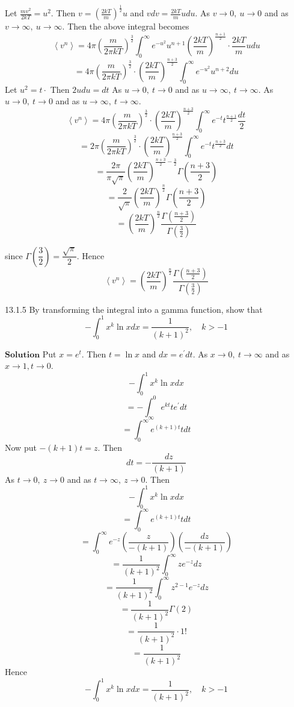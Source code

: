 \documentclass{article}
\begin{document}
\begin{flushleft}
Let $\frac{m v^{2}}{2 k T}=u^{2} .$ Then $v=\left(\frac{2 k T}{m}\right)^{\frac{1}{2}} u$ and $v d v=\frac{2 k T}{m} u d u$. As $v \rightarrow 0, \  u \rightarrow 0$ and as $v \rightarrow \infty, \  u \rightarrow \infty$. Then the above integral becomes
$$
\left\langle v^{n}\right\rangle=4 \pi\left(\frac{m}{2 \pi k T}\right)^{\frac{3}{2}} \int_{0}^{\infty} e^{-u^{2}} u^{n+1}\left(\frac{2 k T}{m}\right)^{\frac{n+1}{2}} \cdot \frac{2 k T}{m} u d u
$$
$$
=4 \pi\left(\frac{m}{2 \pi k T}\right)^{\frac{3}{2}} \cdot\left(\frac{2 k T}{m}\right)^{\frac{n+3}{2}} \int_{0}^{\infty} e^{-u^{2}} u^{n+2} d u
$$
Let $u^{2}=t \cdot$ Then $2 u d u=d t$ As $u \rightarrow 0, \  t \rightarrow 0$ and as $u \rightarrow \infty, \  t \rightarrow \infty$. As $u \rightarrow 0, \  t \rightarrow 0$ and as $u \rightarrow \infty, \  t \rightarrow \infty$.
$$
\left\langle v^{n}\right\rangle=4 \pi\left(\frac{m}{2 \pi k T}\right)^{\frac{3}{2}} \cdot\left(\frac{2 k T}{m}\right)^{\frac{n+3}{2}} \int_{0}^{\infty} e^{-t} t^{\frac{n+1}{2}} \frac{d t}{2}
$$
$$
=2 \pi\left(\frac{m}{2 \pi k T}\right)^{\frac{3}{2}} \cdot\left(\frac{2 k T}{m}\right)^{\frac{n+3}{2}} \int_{0}^{\infty} e^{-t} t^{\frac{n+3}{2}} d t
$$
$$
=\frac{2 \pi}{\pi \sqrt{\pi}}\left(\frac{2 k T}{m}\right)^{\frac{n+3}{2}-\frac{3}{2}} \Gamma\left(\frac{n+3}{2}\right)
$$
$$
=\frac{2}{\sqrt{\pi}}\left(\frac{2 k T}{m}\right)^{\frac{n}{2}} \Gamma\left(\frac{n+3}{2}\right)
$$
$$
=\left(\frac{2 k T}{m}\right)^{\frac{n}{2}} \frac{\Gamma\left(\frac{n+3}{2}\right)}{\Gamma\left(\frac{3}{2}\right)}
$$


since $\Gamma\left(\dfrac{3}{2}\right)=\dfrac{\sqrt{\pi}}{2}$. Hence 
$$\left\langle v^{n}\right\rangle=\left(\dfrac{2 k T}{m}\right)^{\frac{n}{2}} \frac{\Gamma\left(\frac{n+3}{2}\right)}{\Gamma\left(\frac{3}{2}\right)}$$

\newpage


\begin{mybox}{13.1.5}
By transforming the integral into a gamma function, show that
$$
-\int_{0}^{1} x^{k} \ln x d x=\frac{1}{(k+1)^{2}}, \quad k>-1
$$
\end{mybox}

$\boxed{\textbf{Solution}}$ Put $x=e^{t} .$ Then $t=\ln x$ and $d x=e^{\prime} d t$. As $x \rightarrow 0, \  t \rightarrow \infty$ and as $x \rightarrow 1, t \rightarrow 0$.
$$-\int_{0}^{1} x^{k} \ln x d x$$
$$=-\int_{\infty}^{0} e^{k t} t e^{\prime} d t$$
$$=\int_{0}^{\infty} e^{(k+1) t} t d t$$
Now put $-(k+1) t=z .$ Then 
$$d t=-\frac{d z}{(k+1)} $$
As $t \rightarrow 0, \  z \rightarrow 0$ and as $t \rightarrow \infty, \  z \rightarrow 0$. Then
$$-\int_{0}^{1} x^{k} \ln x d x$$
$$=\int_{0}^{\infty} e^{(k+1) t} t d t$$
$$=\int_{0}^{\infty} e^{-z}\left(\frac{z}{-(k+1)}\right)\left(\frac{d z}{-(k+1)}\right)$$
$$=\frac{1}{(k+1)^{2}} \int_{0}^{\infty} z e^{-z} d z$$
$$=\frac{1}{(k+1)^{2}} \int_{0}^{\infty} z^{2-1} e^{-z} d z$$
$$=\frac{1}{(k+1)^{2}} \Gamma(2)$$
$$=\frac{1}{(k+1)^{2}} \cdot 1 !$$
$$=\frac{1}{(k+1)^{2}}$$
Hence
$$
-\int_{0}^{1} x^{k} \ln x d x=\frac{1}{(k+1)^{2}}, \quad k>-1
$$


\end{flushleft}
\end{document}

